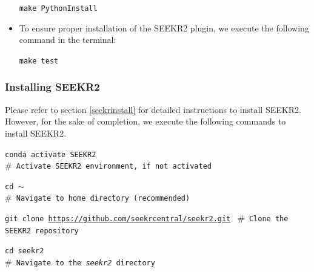 \documentclass[9pt,training,pubversion]{livecoms}
\newcommand{\seekrgithublink}{\url{https://github.com/seekrcentral/seekr2.git}}
\begin{document}
\begin{itemize}
\begin{tcolorbox}[colback=black!8!white, colframe=black!50!black, fontlower=\tiny, left=2pt, right=2pt, top=2pt, bottom=2pt] 
\texttt{make PythonInstall} 
\end{tcolorbox} 

\item To ensure proper installation of the SEEKR2 plugin, we execute the following command in the terminal:

\begin{tcolorbox}[colback=black!8!white, colframe=black!50!black, fontlower=\tiny, left=2pt, right=2pt, top=2pt, bottom=2pt] 
\texttt{make test} 
\end{tcolorbox} 

\end{itemize}

\subsubsection{Installing SEEKR2}
\vspace{2mm}

Please refer to section \ref{seekrinstall} for detailed instructions to install SEEKR2. However, for the sake of completion, we execute the following commands to install SEEKR2.  \par 

\begin{tcolorbox}[colback=black!8!white, colframe=black!50!black, fontlower=\tiny, left=2pt, right=2pt, top=2pt, bottom=2pt] 
\texttt{conda activate SEEKR2} \\
\texttt{$\#$ Activate SEEKR2 environment, if not activated} 
\end{tcolorbox}

\begin{tcolorbox}[colback=black!8!white, colframe=black!50!black, fontlower=\tiny, left=2pt, right=2pt, top=2pt, bottom=2pt] 
\texttt{cd $\sim$} \\
\texttt{$\#$ Navigate to home directory (recommended)} 
\end{tcolorbox}

\begin{tcolorbox}[colback=black!8!white, colframe=black!50!black, fontlower=\tiny, left=2pt, right=2pt, top=2pt, bottom=2pt] 
\texttt{git clone \seekrgithublink} \texttt{ \linebreak $\#$ Clone the SEEKR2 repository}
\end{tcolorbox}

\begin{tcolorbox}[colback=black!8!white, colframe=black!50!black, fontlower=\tiny, left=2pt, right=2pt, top=2pt, bottom=2pt] 
\texttt{cd seekr2} \\
\texttt{$\#$ Navigate to the \textit{seekr2} directory} 
\end{tcolorbox}
\end{document}
